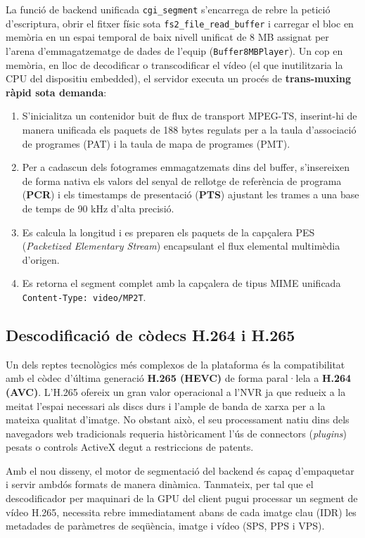La funció de backend unificada \texttt{cgi\_segment} s'encarrega de rebre la petició d'escriptura, obrir el fitxer físic sota \texttt{fs2\_file\_read\_buffer} i carregar el bloc en memòria en un espai temporal de baix nivell unificat de 8 MB assignat per l'arena d'emmagatzematge de dades de l'equip (\texttt{Buffer8MBPlayer}). Un cop en memòria, en lloc de decodificar o transcodificar el vídeo (el que inutilitzaria la CPU del dispositiu embedded), el servidor executa un procés de \textbf{trans-muxing ràpid sota demanda}:
\begin{enumerate}
  \item S'inicialitza un contenidor buit de flux de transport MPEG-TS, inserint-hi de manera unificada els paquets de 188 bytes regulats per a la taula d'associació de programes (PAT) i la taula de mapa de programes (PMT).
  \item Per a cadascun dels fotogrames emmagatzemats dins del buffer, s'insereixen de forma nativa els valors del senyal de rellotge de referència de programa (\textbf{PCR}) i els timestamps de presentació (\textbf{PTS}) ajustant les trames a una base de temps de 90 kHz d'alta precisió.
  \item Es calcula la longitud i es preparen els paquets de la capçalera PES (\textit{Packetized Elementary Stream}) encapsulant el flux elemental multimèdia d'origen.
  \item Es retorna el segment complet amb la capçalera de tipus MIME unificada \texttt{Content-Type: video/MP2T}.
\end{enumerate}

\subsection{Descodificació de còdecs H.264 i H.265}
Un dels reptes tecnològics més complexos de la plataforma és la compatibilitat amb el còdec d'última generació \textbf{H.265 (HEVC)} de forma paral·lela a \textbf{H.264 (AVC)}. L'H.265 ofereix un gran valor operacional a l'NVR ja que redueix a la meitat l'espai necessari als discs durs i l'ample de banda de xarxa per a la mateixa qualitat d'imatge. No obstant això, el seu processament natiu dins dels navegadors web tradicionals requeria històricament l'ús de connectors (\textit{plugins}) pesats o controls ActiveX degut a restriccions de patents.

Amb el nou disseny, el motor de segmentació del backend és capaç d'empaquetar i servir ambdós formats de manera dinàmica. Tanmateix, per tal que el descodificador per maquinari de la GPU del client pugui processar un segment de vídeo H.265, necessita rebre immediatament abans de cada imatge clau (IDR) les metadades de paràmetres de seqüència, imatge i vídeo (SPS, PPS i VPS).

